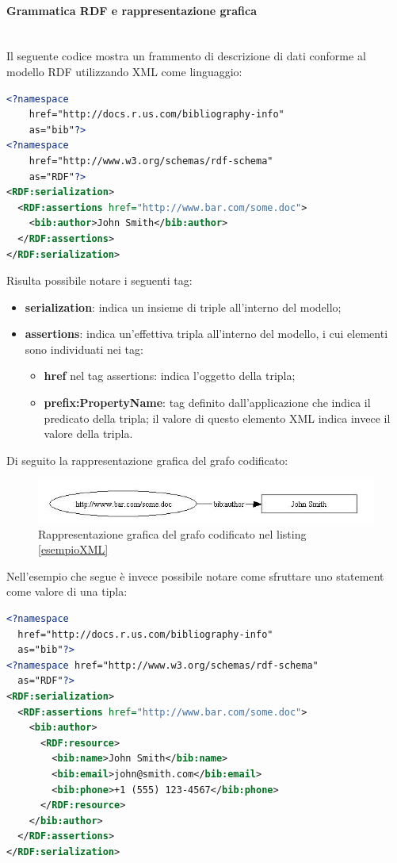 \documentclass[12pt,a4paper,twoside]{book}
\begin{document}
\paragraph{Grammatica RDF e rappresentazione grafica}\mbox{}\\
Il seguente codice mostra un frammento di descrizione di dati conforme al modello RDF utilizzando XML come linguaggio:
\begin{lstlisting}[language=xml,firstnumber=1,caption={Esempio di metadato conforme ad RDF in XML},captionpos=b,label=esempioXML]
<?namespace 
	href="http://docs.r.us.com/bibliography-info"
	as="bib"?> 
<?namespace 
	href="http://www.w3.org/schemas/rdf-schema"
	as="RDF"?> 
<RDF:serialization> 
  <RDF:assertions href="http://www.bar.com/some.doc"> 
    <bib:author>John Smith</bib:author> 
  </RDF:assertions> 
</RDF:serialization>
\end{lstlisting}
Risulta possibile notare i seguenti tag:
\begin{itemize}
\item \textbf{serialization}: indica un insieme di triple all'interno del modello;
\item \textbf{assertions}: indica un'effettiva tripla all'interno del modello, i cui elementi sono individuati nei tag:
\begin{itemize}
\item \textbf{href} nel tag assertions: indica l'oggetto della tripla;
\item \textbf{prefix:PropertyName}: tag definito dall'applicazione che indica il predicato della tripla; il valore di questo elemento XML indica invece il valore della tripla.
\end{itemize}
\end{itemize}
Di seguito la rappresentazione grafica del grafo codificato:
\begin{figure}[H]
\centering
\includegraphics[scale=.50]{../immagini/RDFXML.jpg}
\caption{Rappresentazione grafica del grafo codificato nel listing \ref{esempioXML}}
\label{imgEsempioXML}
\end{figure}\newpage
Nell'esempio che segue è invece possibile notare come sfruttare uno statement come valore di una tipla:
\begin{lstlisting}[language=xml,firstnumber=1,caption={Esempio di metadato conforme ad RDF in XML},captionpos=b,label=esempioComplexXML]
<?namespace 
  href="http://docs.r.us.com/bibliography-info"
  as="bib"?> 
<?namespace href="http://www.w3.org/schemas/rdf-schema"
  as="RDF"?> 
<RDF:serialization> 
  <RDF:assertions href="http://www.bar.com/some.doc"> 
    <bib:author> 
      <RDF:resource> 
        <bib:name>John Smith</bib:name> 
        <bib:email>john@smith.com</bib:email> 
        <bib:phone>+1 (555) 123-4567</bib:phone> 
      </RDF:resource> 
    </bib:author> 
  </RDF:assertions> 
</RDF:serialization>
\end{lstlisting}
\end{document}
